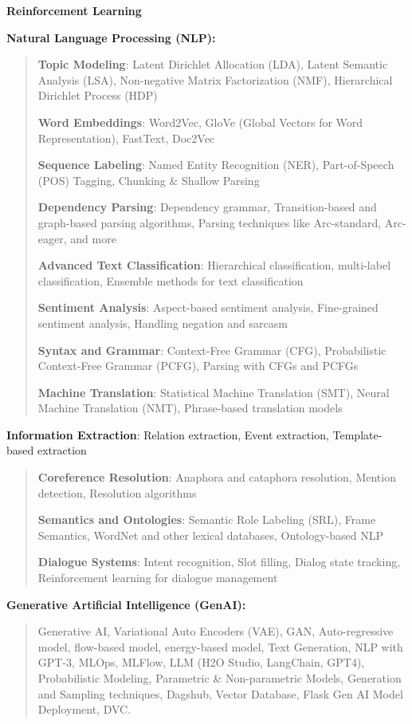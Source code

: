 \documentclass[a4paper]{article}
\begin{document}
\textbf{Reinforcement Learning}

\textbf{Natural Language Processing (NLP):}

\begin{quote}
\textbf{Topic Modeling}: Latent Dirichlet Allocation (LDA), Latent
Semantic Analysis (LSA), Non-negative Matrix Factorization (NMF),
Hierarchical Dirichlet Process (HDP)

\textbf{Word Embeddings}: Word2Vec, GloVe (Global Vectors for Word
Representation), FastText, Doc2Vec

\textbf{Sequence Labeling}: Named Entity Recognition (NER),
Part-of-Speech (POS) Tagging, Chunking \& Shallow Parsing

\textbf{Dependency Parsing}: Dependency grammar, Transition-based and
graph-based parsing algorithms, Parsing techniques like Arc-standard,
Arc-eager, and more

\textbf{Advanced Text Classification}: Hierarchical classification,
multi-label classification, Ensemble methods for text classification

\textbf{Sentiment Analysis}: Aspect-based sentiment analysis,
Fine-grained sentiment analysis, Handling negation and sarcasm

\textbf{Syntax and Grammar}: Context-Free Grammar (CFG), Probabilistic
Context-Free Grammar (PCFG), Parsing with CFGs and PCFGs

\textbf{Machine Translation}: Statistical Machine Translation (SMT),
Neural Machine Translation (NMT), Phrase-based translation models
\end{quote}

\textbf{Information Extraction}: Relation extraction, Event extraction,
Template-based extraction

\begin{quote}
\textbf{Coreference Resolution}: Anaphora and cataphora resolution,
Mention detection, Resolution algorithms

\textbf{Semantics and Ontologies}: Semantic Role Labeling (SRL), Frame
Semantics, WordNet and other lexical databases, Ontology-based NLP

\textbf{Dialogue Systems}: Intent recognition, Slot filling, Dialog
state tracking, Reinforcement learning for dialogue management
\end{quote}

\textbf{Generative Artificial Intelligence (GenAI):}

\begin{quote}
Generative AI, Variational Auto Encoders (VAE), GAN, Auto-regressive
model, flow-based model, energy-based model, Text Generation, NLP with
GPT-3, MLOps, MLFlow, LLM (H2O Studio, LangChain, GPT4), Probabilistic
Modeling, Parametric \& Non-parametric Models, Generation and Sampling
techniques, Dagshub, Vector Database, Flask Gen AI Model Deployment,
DVC.
\end{quote}
\end{document}
